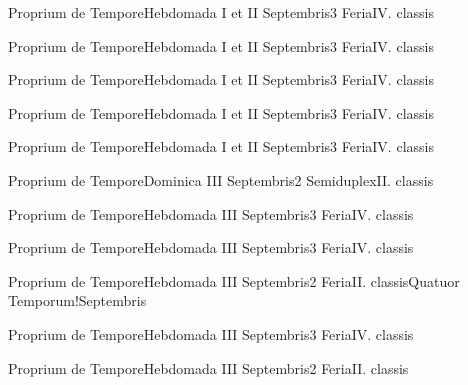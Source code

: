 \documentclass[liber-responsorialis-aestivus.tex]{subfiles}
\begin{document}
	{Proprium de Tempore}{Hebdomada I et II Septembris}{3}{}
	{Feria}{IV. classis}{}
	{}
	{}

	{Proprium de Tempore}{Hebdomada I et II Septembris}{3}{}
	{Feria}{IV. classis}{}
	{}
	{}

	{Proprium de Tempore}{Hebdomada I et II Septembris}{3}{}
	{Feria}{IV. classis}{}
	{}
	{}

	{Proprium de Tempore}{Hebdomada I et II Septembris}{3}{}
	{Feria}{IV. classis}{}
	{}
	{}

	{Proprium de Tempore}{Hebdomada I et II Septembris}{3}{}
	{Feria}{IV. classis}{}
	{}
	{}

	{Proprium de Tempore}{Dominica III Septembris}{2}{}
	{Semiduplex}{II. classis}{}
	{}
	{}

	{Proprium de Tempore}{Hebdomada III Septembris}{3}{}
	{Feria}{IV. classis}{}
	{}
	{}


	{Proprium de Tempore}{Hebdomada III Septembris}{3}{}
	{Feria}{IV. classis}{}
	{}
	{}

	{Proprium de Tempore}{Hebdomada III Septembris}{2}{}
	{Feria}{II. classis}{Quatuor Temporum!Septembris}
	{}
	{}

	{Proprium de Tempore}{Hebdomada III Septembris}{3}{}
	{Feria}{IV. classis}{}
	{}
	{}

	{Proprium de Tempore}{Hebdomada III Septembris}{2}{}
	{Feria}{II. classis}{}
	{}
	{}
\end{document}
